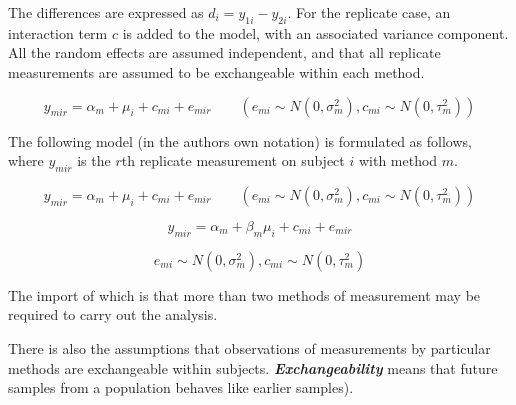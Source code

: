 \documentclass[12pt, a4paper]{report}
\theoremstyle{plain}
\theoremstyle{definition}
\theoremstyle{remark}
\begin{document}
	
	
	
	
	The differences are expressed as $d_{i} = y_{1i} - y_{2i}$.
	For the
	replicate case, an interaction term $c$ is added to the model,
	with an associated variance component. 
	All the random effects are
	assumed independent, and that all replicate measurements are
	assumed to be exchangeable within each method.
	
	
	
	\begin{equation}
	y_{mir}  = \alpha_{m} + \mu_{i} + c_{mi} + e_{mir} \qquad ( e_{mi}
	\sim N(0,\sigma^{2}_{m}), c_{mi} \sim N(0,\tau^{2}_{m}))
	\end{equation}
	
	
	
	
	
	
	
	
	
	
	The following model (in the authors own notation) is
	formulated as follows, where $y_{mir}$ is the $r$th replicate
	measurement on subject $i$ with method $m$.
	
	{
		
		\begin{equation}
		y_{mir}  = \alpha_{m} + \mu_{i} + c_{mi} + e_{mir} \qquad ( e_{mi}
		\sim N(0,\sigma^{2}_{m}), c_{mi} \sim N(0,\tau^{2}_{m}))
		\end{equation}
		
		
		\begin{equation}
		y_{mir}  = \alpha_{m} + \beta_{m}\mu_{i} + c_{mi} + e_{mir} 
		\end{equation}
		
		\[ e_{mi} \sim N(0,\sigma^{2}_{m}), c_{mi} \sim N(0,\tau^{2}_{m})\]
	}
	
	
	The
	import of which is that more than two methods of measurement may
	be required to carry out the analysis. 
	
	There is also the
	assumptions that observations of measurements by particular
	methods are exchangeable within subjects.  \textbf{\textit{Exchangeability}} means
	that future samples from a population behaves like earlier
	samples).
	
\end{document}
